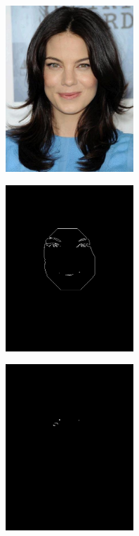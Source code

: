 \begin{figure}[H]
\centering

\begin{subfigure}{.25\textwidth}
  \centering
  \includegraphics[width=0.53\textwidth]{img/fd3/fail3_input.jpg}
  \caption{}
\end{subfigure}%
\begin{subfigure}{.25\textwidth}
  \centering
  \includegraphics[width=0.53\textwidth]{img/fd3/fail3_faceBorder.png}
  \caption{}
\end{subfigure}%
\begin{subfigure}{.25\textwidth}
  \centering
  \includegraphics[width=0.53\textwidth]{img/fd3/fail3_eyeCandidates.png}

\end{subfigure}
\end{figure}
